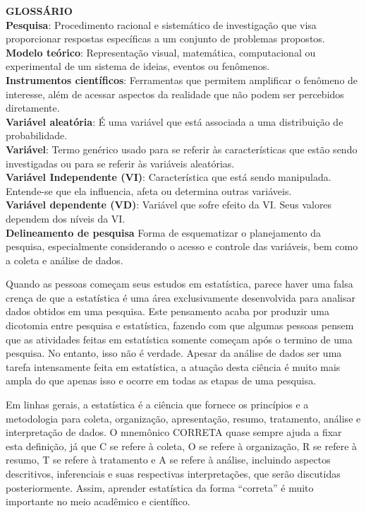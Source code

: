\documentclass[
]{book}
\newenvironment{glossario}{
  \definecolor{shadecolor}{rgb}{0, 0, 0}  %
  \color{white}
  \begin{shaded}}
 {\end{shaded}}
\begin{document}
\begin{glossario}

\textbf{GLOSSÁRIO}\\
\textbf{Pesquisa}: Procedimento racional e sistemático de investigação que visa proporcionar respostas específicas a um conjunto de problemas propostos.\\
\textbf{Modelo teórico}: Representação visual, matemática, computacional ou experimental de um sistema de ideias, eventos ou fenômenos.\\
\textbf{Instrumentos científicos}: Ferramentas que permitem amplificar o fenômeno de interesse, além de acessar aspectos da realidade que não podem ser percebidos diretamente.\\
\textbf{Variável aleatória}: É uma variável que está associada a uma distribuição de probabilidade.\\
\textbf{Variável}: Termo genérico usado para se referir às características que estão sendo investigadas ou para se referir às variáveis aleatórias.\\
\textbf{Variável Independente (VI)}: Característica que está sendo manipulada. Entende-se que ela influencia, afeta ou determina outras variáveis.\\
\textbf{Variável dependente (VD)}: Variável que sofre efeito da VI. Seus valores dependem dos níveis da VI.\\
\textbf{Delineamento de pesquisa} Forma de esquematizar o planejamento da pesquisa, especialmente considerando o acesso e controle das variáveis, bem como a coleta e análise de dados.

\end{glossario}

Quando as pessoas começam seus estudos em estatística, parece haver uma falsa crença de que a estatística é uma área exclusivamente desenvolvida para analisar dados obtidos em uma pesquisa. Este pensamento acaba por produzir uma dicotomia entre pesquisa e estatística, fazendo com que algumas pessoas pensem que as atividades feitas em estatística somente começam após o termino de uma pesquisa. No entanto, isso não é verdade. Apesar da análise de dados ser uma tarefa intensamente feita em estatística, a atuação desta ciência é muito mais ampla do que apenas isso e ocorre em todas as etapas de uma pesquisa.

Em linhas gerais, a estatística é a ciência que fornece os princípios e a metodologia para coleta, organização, apresentação, resumo, tratamento, análise e interpretação de dados. O mnemônico CORRETA quase sempre ajuda a fixar esta definição, já que C se refere à coleta, O se refere à organização, R se refere à resumo, T se refere à tratamento e A se refere à análise, incluindo aspectos descritivos, inferenciais e suas respectivas interpretações, que serão discutidas posteriormente. Assim, aprender estatística da forma ``correta'' é muito importante no meio acadêmico e científico.
\end{document}
